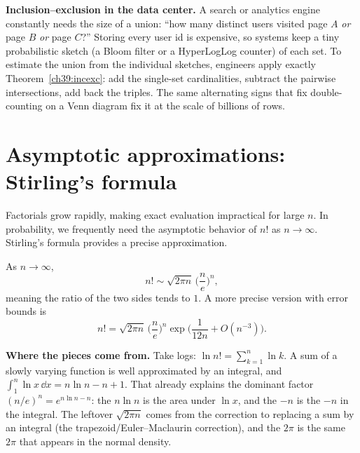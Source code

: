 \begin{applicationbox}
\textbf{Inclusion--exclusion in the data center.} A search or analytics engine
constantly needs the size of a union: ``how many distinct users visited page
$A$ \emph{or} page $B$ \emph{or} page $C$?'' Storing every user id is
expensive, so systems keep a tiny probabilistic sketch (a Bloom filter or a
HyperLogLog counter) of each set. To estimate the union from the individual
sketches, engineers apply exactly Theorem~\ref{ch39:incexc}: add the
single-set cardinalities, subtract the pairwise intersections, add back the
triples. The same alternating signs that fix double-counting on a Venn diagram
fix it at the scale of billions of rows.
\end{applicationbox}

\section{Asymptotic approximations: Stirling's formula}
\label{ch39:asymptotics}

Factorials grow rapidly, making exact evaluation impractical for large $n$. In
probability, we frequently need the asymptotic behavior of $n!$ as $n \to
\infty$. Stirling's formula provides a precise approximation.

\begin{theorem}
\label{ch39:stirling}
As $n \to \infty$,
\[
  n! \sim \sqrt{2\pi n}\,\Big(\frac{n}{e}\Big)^{n},
\]
meaning the ratio of the two sides tends to $1$. A more precise version with
error bounds is
\[
  n! = \sqrt{2\pi n}\,\Big(\frac{n}{e}\Big)^{n}
  \exp\!\Big(\frac{1}{12n} + O(n^{-3})\Big).
\]
\end{theorem}

\begin{happeningbox}
\textbf{Where the pieces come from.} Take logs: $\ln n! = \sum_{k=1}^n \ln k$.
A sum of a slowly varying function is well approximated by an integral, and
$\int_1^n \ln x\,\dd x = n\ln n - n + 1$. That already explains the dominant
factor $(n/e)^n = e^{n\ln n - n}$: the $n \ln n$ is the area under $\ln x$, and
the $-n$ is the $-n$ in the integral. The leftover $\sqrt{2\pi n}$ comes from
the correction to replacing a sum by an integral (the trapezoid/Euler--Maclaurin
correction), and the $2\pi$ is the same $2\pi$ that appears in the normal
density.
\end{happeningbox}


